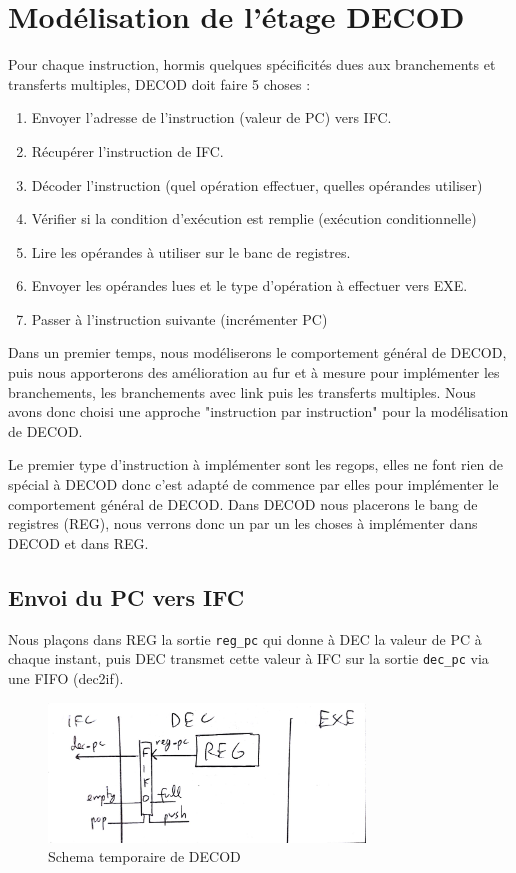 \documentclass{article}
\begin{document}
\section{Modélisation de l'étage DECOD}

Pour chaque instruction, hormis quelques spécificités dues aux branchements
et transferts multiples, DECOD doit faire 5 choses :
\begin{enumerate}
  \item Envoyer l'adresse de l'instruction (valeur de PC) vers IFC.
  \item Récupérer l'instruction de IFC.
  \item Décoder l'instruction (quel opération effectuer, quelles opérandes utiliser)
  \item Vérifier si la condition d'exécution est remplie (exécution conditionnelle)
  \item Lire les opérandes à utiliser sur le banc de registres.
  \item Envoyer les opérandes lues et le type d'opération à effectuer vers EXE.
  \item Passer à l'instruction suivante (incrémenter PC)
\end{enumerate}

Dans un premier temps, nous modéliserons le comportement général de DECOD,
puis nous apporterons des amélioration au fur et à mesure pour implémenter les branchements,
les branchements avec link puis les transferts multiples. Nous avons donc choisi une approche
"instruction par instruction" pour la modélisation de DECOD.

Le premier type d'instruction à implémenter sont les regops, elles ne font rien de spécial
à DECOD donc c'est adapté de commence par elles pour implémenter le comportement général de DECOD.
Dans DECOD nous placerons le bang de registres (REG), nous verrons donc un par un les choses
à implémenter dans DECOD et dans REG.

\subsection{Envoi du PC vers IFC}

Nous plaçons dans REG la sortie \texttt{reg\_pc} qui donne à DEC la valeur de PC à chaque instant,
puis DEC transmet cette valeur à IFC sur la sortie \texttt{dec\_pc} via une FIFO (dec2if).

\begin{figure}[H]
\includegraphics[width=0.75\textwidth]{pics/dec1.png}
\centering
\caption{Schema temporaire de DECOD}
\label{dec1}
\end{figure}
\end{document}
